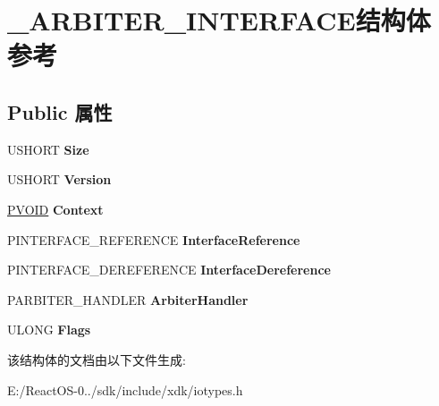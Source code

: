 \hypertarget{struct___a_r_b_i_t_e_r___i_n_t_e_r_f_a_c_e}{}\section{\+\_\+\+A\+R\+B\+I\+T\+E\+R\+\_\+\+I\+N\+T\+E\+R\+F\+A\+C\+E结构体 参考}
\label{struct___a_r_b_i_t_e_r___i_n_t_e_r_f_a_c_e}
\subsection*{Public 属性}
\begin{DoxyCompactItemize}
\item 
\mbox{\label{struct___a_r_b_i_t_e_r___i_n_t_e_r_f_a_c_e_aaf694ba97023e01031a23d71b768128c}} 
U\+S\+H\+O\+RT {\bfseries Size}
\item 
\mbox{\label{struct___a_r_b_i_t_e_r___i_n_t_e_r_f_a_c_e_a0678065fb902e1b76162bc3424bd67ff}} 
U\+S\+H\+O\+RT {\bfseries Version}
\item 
\mbox{\label{struct___a_r_b_i_t_e_r___i_n_t_e_r_f_a_c_e_a0f9d9e88f1d2b1426d478843455efeba}} 
\hyperlink{interfacevoid}{P\+V\+O\+ID} {\bfseries Context}
\item 
\mbox{\label{struct___a_r_b_i_t_e_r___i_n_t_e_r_f_a_c_e_a8f4ba384f963c779b5d04c56cf12fc85}} 
P\+I\+N\+T\+E\+R\+F\+A\+C\+E\+\_\+\+R\+E\+F\+E\+R\+E\+N\+CE {\bfseries Interface\+Reference}
\item 
\mbox{\label{struct___a_r_b_i_t_e_r___i_n_t_e_r_f_a_c_e_af5873c08a849add2750d5c0c0ce837c9}} 
P\+I\+N\+T\+E\+R\+F\+A\+C\+E\+\_\+\+D\+E\+R\+E\+F\+E\+R\+E\+N\+CE {\bfseries Interface\+Dereference}
\item 
\mbox{\label{struct___a_r_b_i_t_e_r___i_n_t_e_r_f_a_c_e_aa9e7b936611574abc51edb3c56dde976}} 
P\+A\+R\+B\+I\+T\+E\+R\+\_\+\+H\+A\+N\+D\+L\+ER {\bfseries Arbiter\+Handler}
\item 
\mbox{\label{struct___a_r_b_i_t_e_r___i_n_t_e_r_f_a_c_e_a422ab280f4530f314249dd998aaeabf3}} 
U\+L\+O\+NG {\bfseries Flags}
\end{DoxyCompactItemize}


该结构体的文档由以下文件生成\+:\begin{DoxyCompactItemize}
\item 
E\+:/\+React\+O\+S-\/0../sdk/include/xdk/iotypes.\+h\end{DoxyCompactItemize}
